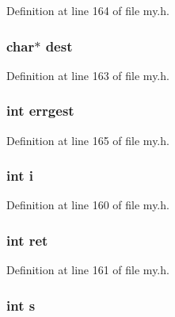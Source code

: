 Definition at line 164 of file my.\+h.

\hypertarget{structs__getline_a21b0374bf8175befbde3cf5ad4831c04}{
\subsubsection[{dest}]{\setlength{\rightskip}{0pt plus 5cm}char$\ast$ dest}}\label{structs__getline_a21b0374bf8175befbde3cf5ad4831c04}


Definition at line 163 of file my.\+h.

\hypertarget{structs__getline_a8311f37b86f9c9b158c003752ab54e84}{
\subsubsection[{errgest}]{\setlength{\rightskip}{0pt plus 5cm}int errgest}}\label{structs__getline_a8311f37b86f9c9b158c003752ab54e84}


Definition at line 165 of file my.\+h.

\hypertarget{structs__getline_acb559820d9ca11295b4500f179ef6392}{
\subsubsection[{i}]{\setlength{\rightskip}{0pt plus 5cm}int i}}\label{structs__getline_acb559820d9ca11295b4500f179ef6392}


Definition at line 160 of file my.\+h.

\hypertarget{structs__getline_a6baa346e44f4c2158d2be4f9b77b8203}{
\subsubsection[{ret}]{\setlength{\rightskip}{0pt plus 5cm}int ret}}\label{structs__getline_a6baa346e44f4c2158d2be4f9b77b8203}


Definition at line 161 of file my.\+h.

\hypertarget{structs__getline_a339d22b3e442946380f98ed19e320db2}{
\subsubsection[{s}]{\setlength{\rightskip}{0pt plus 5cm}int s}}\label{structs__getline_a339d22b3e442946380f98ed19e320db2}


